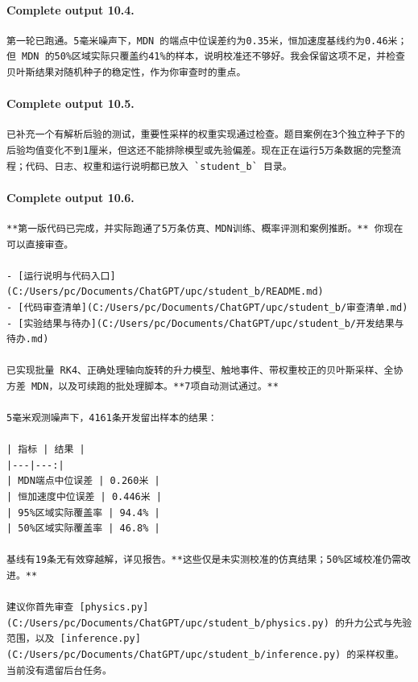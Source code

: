 \documentclass[UTF8,10pt]{ctexart}
\begin{document}
\paragraph{Complete output 10.4.}
\begin{Verbatim}[breaklines=true,breakanywhere=true,fontsize=\scriptsize,frame=single,framesep=2pt]
第一轮已跑通。5毫米噪声下，MDN 的端点中位误差约为0.35米，恒加速度基线约为0.46米；但 MDN 的50%区域实际只覆盖约41%的样本，说明校准还不够好。我会保留这项不足，并检查贝叶斯结果对随机种子的稳定性，作为你审查时的重点。
\end{Verbatim}

\paragraph{Complete output 10.5.}
\begin{Verbatim}[breaklines=true,breakanywhere=true,fontsize=\scriptsize,frame=single,framesep=2pt]
已补充一个有解析后验的测试，重要性采样的权重实现通过检查。题目案例在3个独立种子下的后验均值变化不到1厘米，但这还不能排除模型或先验偏差。现在正在运行5万条数据的完整流程；代码、日志、权重和运行说明都已放入 `student_b` 目录。
\end{Verbatim}

\paragraph{Complete output 10.6.}
\begin{Verbatim}[breaklines=true,breakanywhere=true,fontsize=\scriptsize,frame=single,framesep=2pt]
**第一版代码已完成，并实际跑通了5万条仿真、MDN训练、概率评测和案例推断。** 你现在可以直接审查。

- [运行说明与代码入口](C:/Users/pc/Documents/ChatGPT/upc/student_b/README.md)
- [代码审查清单](C:/Users/pc/Documents/ChatGPT/upc/student_b/审查清单.md)
- [实验结果与待办](C:/Users/pc/Documents/ChatGPT/upc/student_b/开发结果与待办.md)

已实现批量 RK4、正确处理轴向旋转的升力模型、触地事件、带权重校正的贝叶斯采样、全协方差 MDN，以及可续跑的批处理脚本。**7项自动测试通过。**

5毫米观测噪声下，4161条开发留出样本的结果：

| 指标 | 结果 |
|---|---:|
| MDN端点中位误差 | 0.260米 |
| 恒加速度中位误差 | 0.446米 |
| 95%区域实际覆盖率 | 94.4% |
| 50%区域实际覆盖率 | 46.8% |

基线有19条无有效穿越解，详见报告。**这些仅是未实测校准的仿真结果；50%区域校准仍需改进。**

建议你首先审查 [physics.py](C:/Users/pc/Documents/ChatGPT/upc/student_b/physics.py) 的升力公式与先验范围，以及 [inference.py](C:/Users/pc/Documents/ChatGPT/upc/student_b/inference.py) 的采样权重。当前没有遗留后台任务。
\end{Verbatim}
\end{document}
